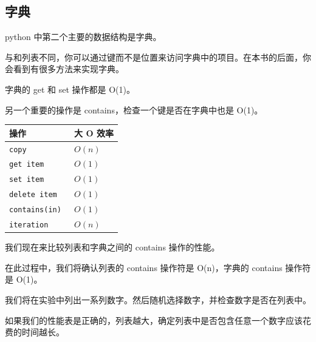 \subsection{字典}

\begin{frame}\ft{\subsecname}
  python 中第二个主要的数据结构是字典。
  
  
  与和列表不同，你可以通过键而不是位置来访问字典中的项目。在本书的后面，你会看到有很多方法来实现字典。
  
  字典的 get 和 set 操作都是 O(1)。
  
  另一个重要的操作是 contains，检查一个键是否在字典中也是 O(1)。
  
  \end{frame}

\begin{frame}[fragile]\ft{\subsecname}


\begin{table}[htbp]
  \centering
  \begin{tabular}{ll} \hline
    操作&大 O 效率 \\\hline
    \lstinline|copy|         & $O(n)$ \\
    \lstinline|get item     |& $O(1)$ \\
    \lstinline|set item|     & $O(1)$ \\
    \lstinline|delete item|  & $O(1)$ \\
    \lstinline|contains(in)| & $O(1)$ \\
    \lstinline|iteration|    & $O(n)$  \\\hline 
  \end{tabular}
\end{table}
\end{frame}

\begin{frame}[fragile]\ft{\subsecname}


我们现在来比较列表和字典之间的 contains 操作的性能。

在此过程中，我们将确认列表的 contains 操作符是 O(n)，字典的 contains 操作符是 O(1)。

我们将在实验中列出一系列数字。然后随机选择数字，并检查数字是否在列表中。

如果我们的性能表是正确的，列表越大，确定列表中是否包含任意一个数字应该花费的时间越长。



\end{frame}



